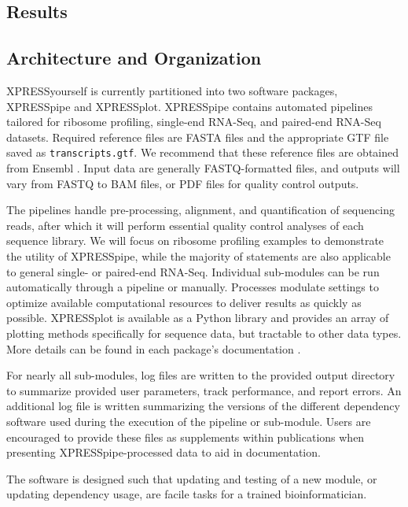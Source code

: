 \documentclass[10pt, oneside]{article}
\begin{document}
\begin{multicols}{2}
\section*{Results}

\subsection*{Architecture and Organization}
XPRESSyourself is currently partitioned into two software packages, XPRESSpipe and XPRESSplot. XPRESSpipe contains automated pipelines tailored for ribosome profiling, single-end RNA-Seq, and paired-end RNA-Seq datasets. Required reference files are FASTA files and the appropriate GTF file saved as \texttt{transcripts.gtf}. We recommend that these reference files are obtained from Ensembl \cite{ensembl}. Input data are generally FASTQ-formatted files, and outputs will vary from FASTQ to BAM files, or PDF files for quality control outputs. \par

The pipelines handle pre-processing, alignment, and quantification of sequencing reads, after which it will perform essential quality control analyses of each sequence library. We will focus on ribosome profiling examples to demonstrate the utility of XPRESSpipe, while the majority of statements are also applicable to general single- or paired-end RNA-Seq. Individual sub-modules can be run automatically through a pipeline or manually. Processes modulate settings to optimize available computational resources to deliver results as quickly as possible. XPRESSplot is available as a Python library and provides an array of plotting methods specifically for sequence data, but tractable to other data types. More details can be found in each package's documentation \cite{xpresspipe_docs, xpressplot_docs}. \par

For nearly all sub-modules, log files are written to the provided output directory to summarize provided user parameters, track performance, and report errors. An additional log file is written summarizing the versions of the different dependency software used during the execution of the pipeline or sub-module. Users are encouraged to provide these files as supplements within publications when presenting XPRESSpipe-processed data to aid in documentation.

The software is designed such that updating and testing of a new module, or updating dependency usage, are facile tasks for a trained bioinformatician.


\end{multicols}
\end{document}
